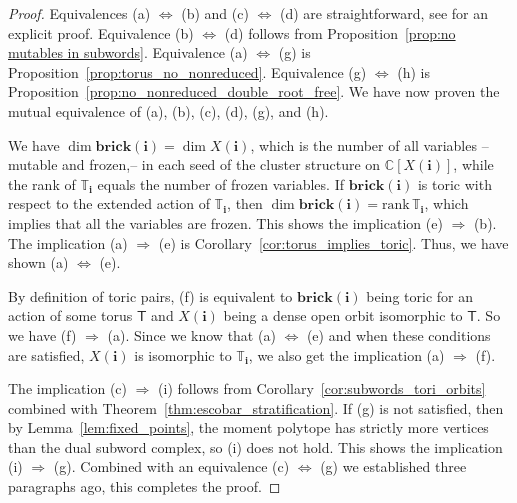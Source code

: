 \documentclass[a4paper, 11pt]{amsart}
\newcommand{\brick}{\mathbf{brick}}
\newcommand{\word}[1]{\mathbf{#1}}
\newcommand{\C}{\mathbb{C}}
\newcommand{\rank}{\mathrm{rank}}
\newcommand{\dil}[1]{\mathbb{T}_{#1}}
\theoremstyle{definition}
\begin{document}
\begin{proof}
Equivalences (a) $\Longleftrightarrow$ (b) and (c) $\Longleftrightarrow$ (d) are straightforward, see \cite[Corollary 2.2]{GKSB} for an explicit proof. Equivalence (b) $\Longleftrightarrow$ (d) follows from Proposition~\ref{prop:no mutables in subwords}.
Equivalence (a) $\Longleftrightarrow$ (g) is Proposition~\ref{prop:torus_no_nonreduced}. Equivalence (g) $\Longleftrightarrow$ (h) is Proposition~\ref{prop:no_nonreduced_double_root_free}. We have now proven the mutual equivalence of (a), (b), (c), (d), (g), and (h).

 We have $\dim \brick(\word{i}) = \dim X(\word{i})$, which is the number of all variables -- mutable and frozen,-- in each seed of the cluster structure on $\C[X(\word{i})]$, while the rank of  $\dil{\word{i}}$ equals the number of frozen variables. If $\brick(\word{i})$ is toric with respect to the extended action of $\dil{\word{i}}$, then  $\dim \brick(\word{i}) = \rank  \, \dil{\word{i}}$, which implies that all the variables are frozen. This shows the implication (e) $\Rightarrow$ (b). The implication (a) $\Rightarrow$ (e) is Corollary~\ref{cor:torus_implies_toric}. Thus, we have shown (a) $\Longleftrightarrow$ (e).

By definition of toric pairs, (f) is equivalent to $\brick({\word{i}})$ being toric for an action of some torus $\mathsf{T}$ and $X(\word{i})$ being a dense open orbit isomorphic to $\mathsf{T}$. So we have (f) $\Rightarrow$ (a). Since we know that (a) $\Longleftrightarrow$ (e) and when these conditions are satisfied,  $X(\word{i})$ is isomorphic to $\dil{\word{i}}$, we also get the  implication (a) $\Rightarrow$ (f).

The implication (c) $\Rightarrow$ (i) follows from Corollary~\ref{cor:subwords_tori_orbits} combined with Theorem~\ref{thm:escobar_stratification}. If (g) is not satisfied, then by Lemma~\ref{lem:fixed_points}, the moment polytope has strictly more vertices than the dual subword complex, so (i)  does not hold. This shows the implication (i) $\Rightarrow$ (g). Combined with an equivalence (c) $\Longleftrightarrow$ (g) we established three paragraphs ago, this completes the proof.
\end{proof}
\end{document}
